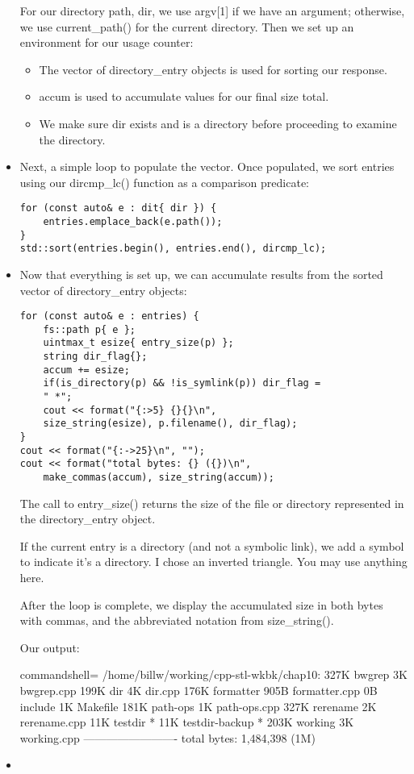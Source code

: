 \begin{itemize}
For our directory path, dir, we use argv[1] if we have an argument; otherwise, we use current\_path() for the current directory. Then we set up an environment for our usage counter:

\begin{itemize}
\item 
The vector of directory\_entry objects is used for sorting our response.

\item 
accum is used to accumulate values for our final size total.

\item 
We make sure dir exists and is a directory before proceeding to examine the directory.
\end{itemize}

\item 
Next, a simple loop to populate the vector. Once populated, we sort entries using our dircmp\_lc() function as a comparison predicate:

\begin{lstlisting}[style=styleCXX]
for (const auto& e : dit{ dir }) {
	entries.emplace_back(e.path());
}
std::sort(entries.begin(), entries.end(), dircmp_lc);
\end{lstlisting}

\item 
Now that everything is set up, we can accumulate results from the sorted vector of directory\_entry objects:

\begin{lstlisting}[style=styleCXX]
for (const auto& e : entries) {
	fs::path p{ e };
	uintmax_t esize{ entry_size(p) };
	string dir_flag{};
	accum += esize;
	if(is_directory(p) && !is_symlink(p)) dir_flag =
	" *";
	cout << format("{:>5} {}{}\n",
	size_string(esize), p.filename(), dir_flag);
}
cout << format("{:->25}\n", "");
cout << format("total bytes: {} ({})\n",
	make_commas(accum), size_string(accum));
\end{lstlisting}

The call to entry\_size() returns the size of the file or directory represented in the directory\_entry object.

If the current entry is a directory (and not a symbolic link), we add a symbol to indicate it's a directory. I chose an inverted triangle. You may use anything here.

After the loop is complete, we display the accumulated size in both bytes with commas, and the abbreviated notation from size\_string().

Our output:

\begin{tcblisting}{commandshell={}}
/home/billw/working/cpp-stl-wkbk/chap10:
327K bwgrep
  3K bwgrep.cpp
199K dir
  4K dir.cpp
176K formatter
905B formatter.cpp
  0B include
  1K Makefile
181K path-ops
  1K path-ops.cpp
327K rerename
  2K rerename.cpp
 11K testdir *
 11K testdir-backup *
203K working
  3K working.cpp
-------------------------
total bytes: 1,484,398 (1M)
\end{tcblisting}

\item 

\end{itemize}

